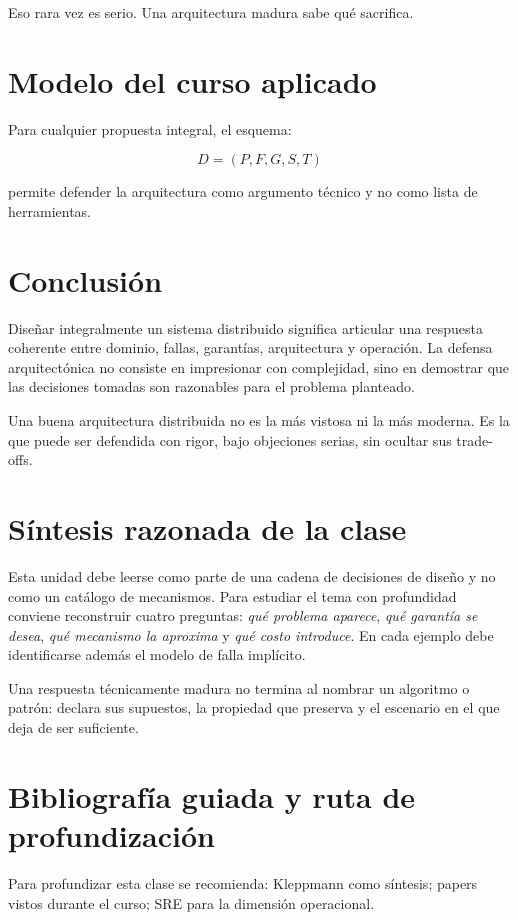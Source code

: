 \documentclass[variant=apuntes,cover=institutional,mode=screen]{ua-engineering-v6-article}
\begin{document}
Eso rara vez es serio. Una arquitectura madura sabe qué sacrifica.

\section{Modelo del curso aplicado}

Para cualquier propuesta integral, el esquema:

\[
D = (P, F, G, S, T)
\]

permite defender la arquitectura como argumento técnico y no como lista de herramientas.

\section{Conclusión}

Diseñar integralmente un sistema distribuido significa articular una respuesta coherente entre dominio, fallas, garantías, arquitectura y operación. La defensa arquitectónica no consiste en impresionar con complejidad, sino en demostrar que las decisiones tomadas son razonables para el problema planteado.

\begin{uakeybox}
Una buena arquitectura distribuida no es la más vistosa ni la más moderna. Es la que puede ser defendida con rigor, bajo objeciones serias, sin ocultar sus trade-offs.
\end{uakeybox}


\section{Síntesis razonada de la clase}
Esta unidad debe leerse como parte de una cadena de decisiones de diseño y no como un catálogo de mecanismos. Para estudiar el tema con profundidad conviene reconstruir cuatro preguntas: \emph{qué problema aparece}, \emph{qué garantía se desea}, \emph{qué mecanismo la aproxima} y \emph{qué costo introduce}. En cada ejemplo debe identificarse además el modelo de falla implícito.

\begin{uakeybox}
Una respuesta técnicamente madura no termina al nombrar un algoritmo o patrón: declara sus supuestos, la propiedad que preserva y el escenario en el que deja de ser suficiente.
\end{uakeybox}

\section{Bibliografía guiada y ruta de profundización}
Para profundizar esta clase se recomienda: Kleppmann como síntesis; papers vistos durante el curso; SRE para la dimensión operacional.
\end{document}
